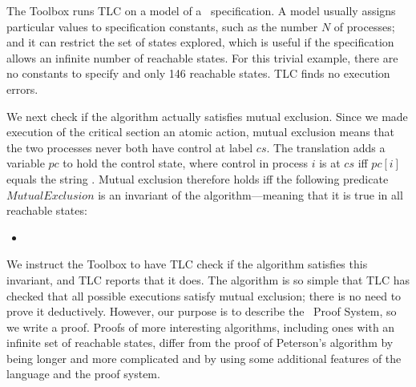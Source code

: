 \documentclass[a4paper]{llncs}
\newenvironment{display}{\begin{itemize}\item[]}{\end{itemize}}
\begin{document}
The Toolbox runs TLC on a model of a \tlaplus\ specification.  A model
usually assigns particular values to specification constants, such as
the number $N$ of processes; and it can restrict the set of states
explored, which is useful if the specification allows an infinite number
of reachable states.  For this trivial example, there are no constants
to specify and only 146 reachable states.  TLC finds no execution
errors.

We next check if the algorithm actually satisfies mutual exclusion.
Since we made execution of the critical section an atomic action,
mutual exclusion means that the two processes never both have control
at label $cs$.  The translation adds a variable $pc$ to hold the
control state, where control in process $i$ is at $cs$ iff $pc[i]$
equals the string .  Mutual exclusion therefore holds iff the
following predicate $MutualExclusion$ is an invariant of the
algorithm---meaning that it is true in all reachable states:
\begin{display}
\begin{tlatex}
\end{tlatex}
\end{display}
We instruct the Toolbox to have TLC check if the algorithm satisfies
this invariant, and TLC reports that it does.  The algorithm is so
simple that TLC has checked that all possible executions satisfy
mutual exclusion; there is no need to prove it deductively.  However,
our purpose is to describe the \tlaplus\ Proof System, so we write a
proof.  Proofs of more interesting algorithms, including ones with an
infinite set of reachable states, differ from the proof of Peterson's
algorithm by being longer and more complicated and by using some
additional features of the language and the proof system.
\end{document}
